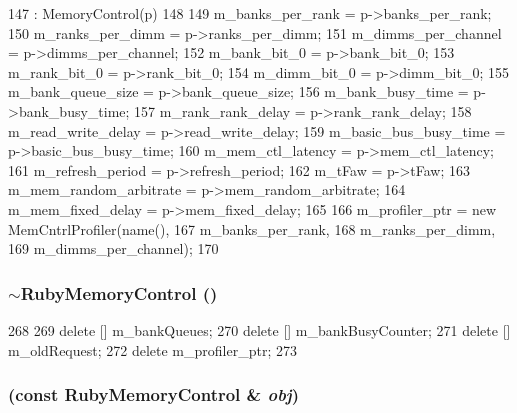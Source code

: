 \begin{DoxyCode}
147     : MemoryControl(p)
148 {
149     m_banks_per_rank = p->banks_per_rank;
150     m_ranks_per_dimm = p->ranks_per_dimm;
151     m_dimms_per_channel = p->dimms_per_channel;
152     m_bank_bit_0 = p->bank_bit_0;
153     m_rank_bit_0 = p->rank_bit_0;
154     m_dimm_bit_0 = p->dimm_bit_0;
155     m_bank_queue_size = p->bank_queue_size;
156     m_bank_busy_time = p->bank_busy_time;
157     m_rank_rank_delay = p->rank_rank_delay;
158     m_read_write_delay = p->read_write_delay;
159     m_basic_bus_busy_time = p->basic_bus_busy_time;
160     m_mem_ctl_latency = p->mem_ctl_latency;
161     m_refresh_period = p->refresh_period;
162     m_tFaw = p->tFaw;
163     m_mem_random_arbitrate = p->mem_random_arbitrate;
164     m_mem_fixed_delay = p->mem_fixed_delay;
165 
166     m_profiler_ptr = new MemCntrlProfiler(name(),
167                                           m_banks_per_rank,
168                                           m_ranks_per_dimm,
169                                           m_dimms_per_channel);
170 }
\end{DoxyCode}
\hypertarget{classRubyMemoryControl_ac811a91e31835fa2b05aec4314ca6870}{
\subsubsection[{$\sim$RubyMemoryControl}]{\setlength{\rightskip}{0pt plus 5cm}$\sim${\bf RubyMemoryControl} ()}}
\label{classRubyMemoryControl_ac811a91e31835fa2b05aec4314ca6870}



\begin{DoxyCode}
268 {
269     delete [] m_bankQueues;
270     delete [] m_bankBusyCounter;
271     delete [] m_oldRequest;
272     delete m_profiler_ptr;
273 }
\end{DoxyCode}
\hypertarget{classRubyMemoryControl_a91e8e84c0a773621f4e6f5adafb726fb}{
\subsubsection[{RubyMemoryControl}]{ (const {\bf RubyMemoryControl} \& {\em obj})}}
\label{classRubyMemoryControl_a91e8e84c0a773621f4e6f5adafb726fb}



